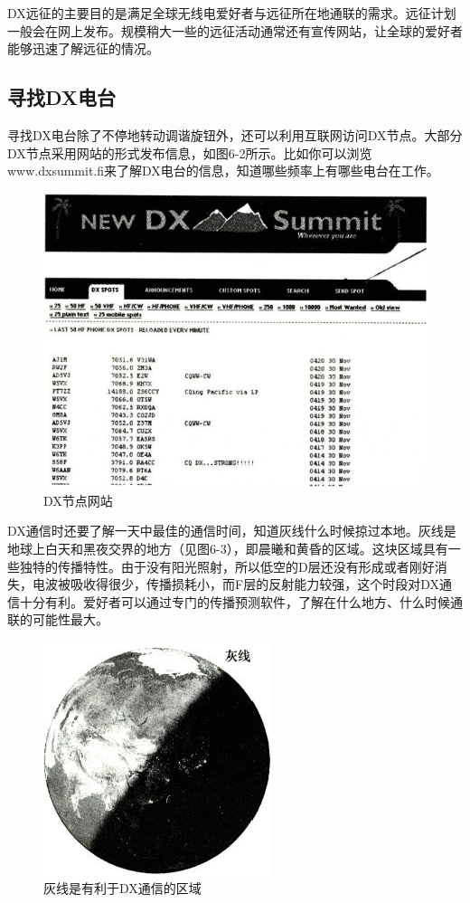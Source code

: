 \documentclass[12pt,UTF8]{ctexbook}
\begin{document}
DX远征的主要目的是满足全球无线电爱好者与远征所在地通联的需求。远征计划一般会在网上发布。规模稍大一些的远征活动通常还有宣传网站，让全球的爱好者能够迅速了解远征的情况。

\subsection{寻找DX电台}

寻找DX电台除了不停地转动调谐旋钮外，还可以利用互联网访问DX节点。大部分DX节点采用网站的形式发布信息，如图6-2所示。比如你可以浏览www.dxsummit.fi来了解DX电台的信息，知道哪些频率上有哪些电台在工作。

\begin{figure}[htbp]
	\centering
	\includegraphics[width=0.7\linewidth]{72}
	\caption{DX节点网站}
	\label{fig:1}
\end{figure}

DX通信时还要了解一天中最佳的通信时间，知道灰线什么时候掠过本地。灰线是地球上白天和黑夜交界的地方（见图6-3），即晨曦和黄昏的区域。这块区域具有一些独特的传播特性。由于没有阳光照射，所以低空的D层还没有形成或者刚好消失，电波被吸收得很少，传播损耗小，而F层的反射能力较强，这个时段对DX通信十分有利。爱好者可以通过专门的传播预测软件，了解在什么地方、什么时候通联的可能性最大。

\begin{figure}[htbp]
	\centering
	\includegraphics[width=0.7\linewidth]{73}
	\caption{灰线是有利于DX通信的区域}
	\label{fig:1}
\end{figure}
\end{document}
